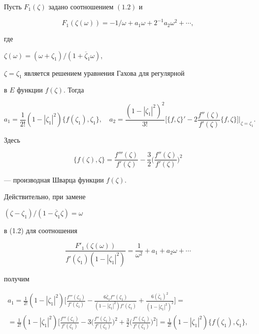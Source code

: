 \begin{lem}


Пусть $F_1(\zeta)$ задано соотношением $(1.2)$ и


$$


F_1(\zeta(\omega))=-1/\omega+a_1\omega+2^{-1}a_2\omega^2+\dotsb,


$$


где


$\zeta(\omega)=(\omega+\zeta_1)/(1+\overline\zeta_1\omega)$,


$\zeta=\zeta_1$ является решением уравнения Гахова для регулярной


в $E$ функции $f(\zeta)$. Тогда


\begin{equation}


a_1=\frac 1{2!}(1-|\zeta_1|^2)\{f(\zeta_1),\zeta_1\},\quad


a_2=\frac{(1-|\zeta_1|^2)^2}{3!}\bigg[\{f,\zeta\}'-2\frac{f''(\zeta)}


{f'(\zeta)}\{f,\zeta\}\bigg]\Big|_{\zeta=\zeta_1}.


\end{equation}


Здесь


$$


\{f(\zeta),\zeta\}=\frac{f'''(\zeta)}{f'(\zeta)}-\frac32\bigg(


\frac{f''(\zeta)}{f'(\zeta)}\bigg)^2


$$


--- производная Шварца функции $f(\zeta)$.


\end{lem}





Действительно, при замене


$(\zeta-\zeta_1)/(1-\overline\zeta_1\zeta)=\omega$


в (1.2) для соотношения


$$


\frac{F'_1(\zeta(\omega))}{f'(\zeta_1)(1-|\zeta_1|^2)}=\frac


1{\omega^2}+a_1+a_2\omega+\dotsb


$$


получим


\begin{gather*}


a_1=\frac


1{2!}(1-|\zeta_1|^2)\bigg[\frac{f'''(\zeta_1)}{f'(\zeta_1)}-


\frac{6\overline\zeta_1 f''(\zeta_1)}{(1-|\zeta_1|^2)f'(\zeta_1)}


+\frac{6(\overline\zeta_1)^2}{(1-|\zeta_1|^2)^2}\bigg]=\\


%


=\frac 1{2!}(1-|\zeta_1|^2)\bigg[\frac{f'''(\zeta_1)}{f'(\zeta_1)}


-3\bigg(\frac{f''(\zeta_1)}{f'(\zeta_1)}\bigg)^2+\frac


32\bigg(\frac{f''(\zeta_1)}{f'(\zeta_1)}\bigg)^2\bigg]=


\frac 1{2!}(1-|\zeta_1|^2)\{f(\zeta_1),\zeta_1\},


\end{gather*}


